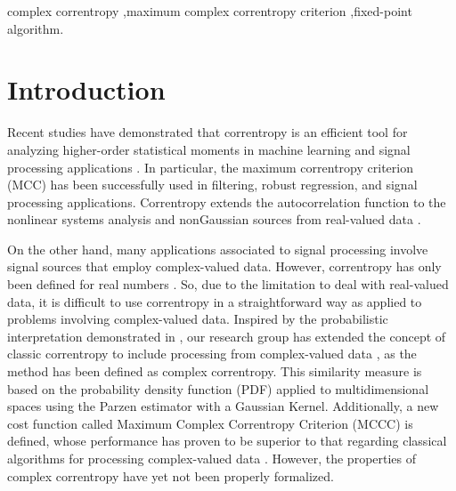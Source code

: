 \documentclass[preprint,12pt]{elsarticle}
\begin{document}
\begin{frontmatter}
\begin{abstract}
\end{abstract}

\begin{keyword}
complex correntropy \sep maximum complex correntropy criterion \sep fixed-point algorithm.

\end{keyword}

\end{frontmatter}



\section{Introduction}



Recent studies have demonstrated that correntropy is an efficient tool for analyzing higher-order statistical moments in machine learning and signal processing applications \citep{liu2007correntropy,fontes2014classification, Fontes2015, fontes2017cyclostationary}. In particular, the maximum correntropy criterion (MCC) has been successfully used in filtering, robust regression, and signal processing applications. Correntropy extends the autocorrelation function to the nonlinear systems analysis and nonGaussian sources from real-valued data \citep{peng2017constrained,he2011maximum}.

On the other hand, many applications associated to signal processing involve signal sources that employ complex-valued data. However, correntropy has only been defined for real numbers \citep{Santamaria2006a}. So, due to the limitation to deal with real-valued data, it is difficult to use correntropy in a straightforward way as applied to problems involving complex-valued data. Inspired by the probabilistic interpretation demonstrated in \citep{integralxy}, our research group has extended the concept of classic correntropy to include processing from complex-valued data \citep{7763864}, as the method has been defined as complex correntropy. This similarity measure is based on the probability density function (PDF) applied to multidimensional spaces using the Parzen estimator with a Gaussian Kernel. Additionally, a new cost function called Maximum Complex Correntropy Criterion (MCCC) is defined, whose performance has proven to be superior to that regarding classical algorithms for processing complex-valued data \citep{7763864}. However, the properties of complex correntropy have yet not been properly formalized. 
\end{document}
